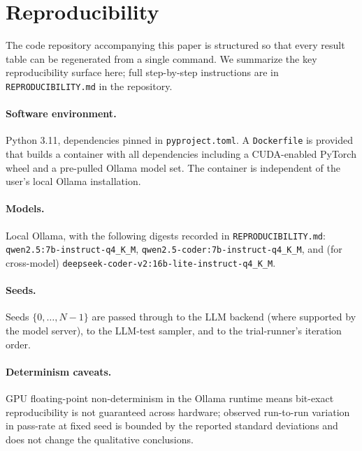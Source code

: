 \documentclass[journal]{IEEEtran}
\begin{document}
\section{Reproducibility}\label{sec:repro}

The code repository accompanying this paper is structured so that every result table can be regenerated from a single command. We summarize the key reproducibility surface here; full step-by-step instructions are in \texttt{REPRODUCIBILITY.md} in the repository.

\paragraph{Software environment.} Python 3.11, dependencies pinned in \texttt{pyproject.toml}. A \texttt{Dockerfile} is provided that builds a container with all dependencies including a CUDA-enabled PyTorch wheel and a pre-pulled Ollama model set. The container is independent of the user's local Ollama installation.

\paragraph{Models.} Local Ollama, with the following digests recorded in \texttt{REPRODUCIBILITY.md}: \texttt{qwen2.5:7b-instruct-q4\_K\_M}, \texttt{qwen2.5-coder:7b-instruct-q4\_K\_M}, and (for cross-model) \nolinkurl{deepseek-coder-v2:16b-lite-instruct-q4_K_M}.

\paragraph{Seeds.} Seeds $\{0, \ldots, N-1\}$ are passed through to the LLM backend (where supported by the model server), to the LLM-test sampler, and to the trial-runner's iteration order.

\paragraph{Determinism caveats.} GPU floating-point non-determinism in the Ollama runtime means bit-exact reproducibility is not guaranteed across hardware; observed run-to-run variation in pass-rate at fixed seed is bounded by the reported standard deviations and does not change the qualitative conclusions.
\end{document}

